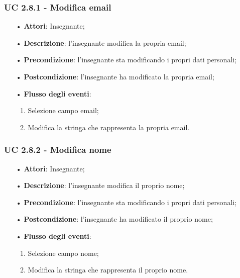 \subsubsection{UC 2.8.1 - Modifica email}
\begin{itemize}
	\item[•]\textbf{Attori}: Insegnante;
	\item[•]\textbf{Descrizione}: l'insegnante modifica la propria email;
	\item[•]\textbf{Precondizione}: l'insegnante sta modificando i propri dati personali;
	\item[•]\textbf{Postcondizione}: l'insegnante ha modificato la propria email; 
	\item[•]\textbf{Flusso degli eventi}: 
	\begin{enumerate}
		\item Selezione campo email;
		\item Modifica la stringa che rappresenta la propria email.
	\end{enumerate}
\end{itemize}

\subsubsection{UC 2.8.2 - Modifica nome}
\begin{itemize}
	\item[•]\textbf{Attori}: Insegnante;
	\item[•]\textbf{Descrizione}: l'insegnante modifica il proprio nome;
	\item[•]\textbf{Precondizione}: l'insegnante sta modificando i propri dati personali;
	\item[•]\textbf{Postcondizione}: l'insegnante ha modificato il proprio nome; 
	\item[•]\textbf{Flusso degli eventi}: 
	\begin{enumerate}
		\item Selezione campo nome;
		\item Modifica la stringa che rappresenta il proprio nome.
	\end{enumerate}
\end{itemize}

